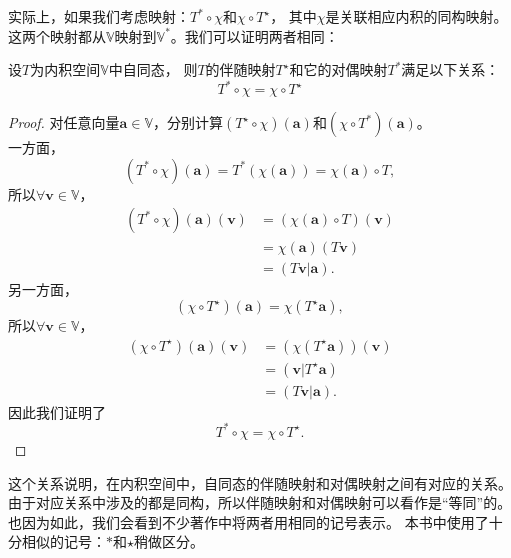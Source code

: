 \documentclass[12pt,UTF8]{ctexbook}
\begin{document}
实际上，如果我们考虑映射：$T^* \circ \chi$和$\chi \circ T^\star$，
其中$\chi$是关联相应内积的同构映射。这两个映射都从$\mathbb{V}$映射到$\mathbb{V}^*$。我们可以证明两者相同：
\begin{pp}\label{pp:8_6}
    设$T$为内积空间$\mathbb{V}$中自同态，
    则$T$的伴随映射$T^\star$和它的对偶映射$T^*$满足以下关系：
    $$ T^* \circ \chi = \chi \circ T^\star $$
\end{pp}
\begin{proof} %
    对任意向量$\mathbf{a} \in \mathbb{V}$，分别计算$\left(T^\star \circ \chi\right)(\mathbf{a})$和$\left(\chi \circ T^*\right)(\mathbf{a})$。\\
    一方面，
    $$ \left(T^* \circ \chi\right)(\mathbf{a}) = T^* \left(\chi(\mathbf{a})\right) = \chi(\mathbf{a}) \circ T, $$
    所以$\forall \mathbf{v} \in \mathbb{V}$，
    \begin{align*}
        \left(T^* \circ \chi\right)(\mathbf{a})(\mathbf{v}) &= \left(\chi(\mathbf{a}) \circ T\right) (\mathbf{v})  \\
        &= \chi(\mathbf{a}) \left(T\mathbf{v} \right)  \\
        &= \left(T\mathbf{v} | \mathbf{a}\right). 
    \end{align*}
    另一方面，
    $$ \left(\chi \circ T^\star\right)(\mathbf{a}) = \chi \left(T^\star\mathbf{a}\right), $$
    所以$\forall \mathbf{v} \in \mathbb{V}$，
    \begin{align*}
        \left(\chi \circ T^\star\right)(\mathbf{a})(\mathbf{v}) &= \left(\chi \left(T^\star\mathbf{a}\right)\right) (\mathbf{v})  \\
        &= \left(\mathbf{v} | T^\star\mathbf{a}\right)  \\
        &= \left(T\mathbf{v} | \mathbf{a}\right). 
    \end{align*}
    因此我们证明了
    $$ T^* \circ \chi = \chi \circ T^\star. $$

\end{proof}

这个关系说明，在内积空间中，自同态的伴随映射和对偶映射之间有对应的关系。
由于对应关系中涉及的都是同构，所以伴随映射和对偶映射可以看作是“等同”的。
也因为如此，我们会看到不少著作中将两者用相同的记号表示。
本书中使用了十分相似的记号：$*$和$\star$稍做区分。
\end{document}
